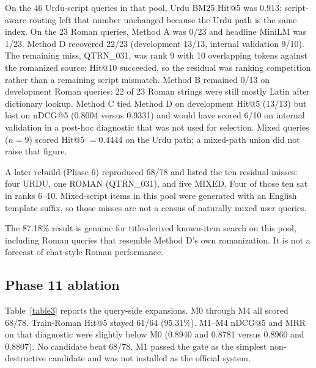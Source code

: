 \documentclass[10pt,letterpaper]{article}
\begin{document}
On the 46 Urdu-script queries in that pool, Urdu BM25 Hit@5 was 0.913; script-aware routing left that number unchanged because the Urdu path is the same index. On the 23 Roman queries, Method A was 0/23 and headline MiniLM was 1/23. Method D recovered 22/23 (development 13/13, internal validation 9/10). The remaining miss, QTRN\_031, was rank 9 with 10 overlapping tokens against the romanized source: Hit@10 succeeded, so the residual was ranking competition rather than a remaining script mismatch. Method B remained 0/13 on development Roman queries: 22 of 23 Roman strings were still mostly Latin after dictionary lookup. Method C tied Method D on development Hit@5 (13/13) but lost on nDCG@5 (0.8004 versus 0.9331) and would have scored 6/10 on internal validation in a post-hoc diagnostic that was not used for selection. Mixed queries ($n = 9$) scored Hit@5 $= 0.4444$ on the Urdu path; a mixed-path union did not raise that figure.

A later rebuild (Phase 6) reproduced 68/78 and listed the ten residual misses: four URDU, one ROMAN (QTRN\_031), and five MIXED. Four of those ten sat in ranks 6--10. Mixed-script items in this pool were generated with an English template suffix, so those misses are not a census of naturally mixed user queries.

The 87.18\% result is genuine for title-derived known-item search on this pool, including Roman queries that resemble Method D's own romanization. It is not a forecast of chat-style Roman performance.

\subsection*{Phase 11 ablation}

Table~\ref{table3} reports the query-side expansions. M0 through M4 all scored 68/78. Train-Roman Hit@5 stayed 61/64 (95.31\%). M1--M4 nDCG@5 and MRR on that diagnostic were slightly below M0 (0.8940 and 0.8781 versus 0.8960 and 0.8807). No candidate beat 68/78. M1 passed the gate as the simplest non-destructive candidate and was not installed as the official system.
\end{document}
